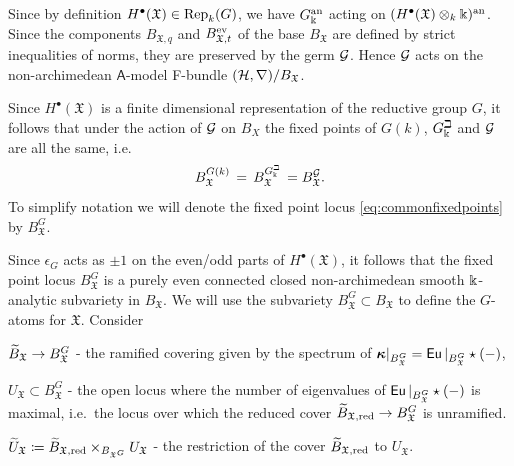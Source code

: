 \documentclass[twoside,leqno]{article}
\numberwithin{equation}{section}
\theoremstyle{plain}
\theoremstyle{definition}
\begin{document}
Since by definition $H^{\bullet}(\mathfrak{X}) \in \operatorname{Rep}_{k}(G)$, we have $G_\Bbbk^{\mathrm{an}}$ acting on $(H^{\bullet}(\mathfrak{X})\otimes_{k} \Bbbk)^{\operatorname{an}}$.
Since the components $B_{\mathfrak{X},q}$ and $B_{\mathfrak{X},t}^{\mathrm{ev}}$ of the base $B_{\mathfrak{X}}$ are defined by strict inequalities of norms, they are preserved by the germ $\mathcal{G}$.
Hence $\mathcal{G}$ acts on the non-archimedean $\mathsf{A}$-model F-bundle $(\mathcal H,\nabla)/B_{\mathfrak{X}}$.

Since $H^{\bullet}(\mathfrak{X})$ is a finite dimensional representation of the reductive group $G$, it follows that under the action of $\mathcal{G}$ on $B_{X}$ the fixed points of $G(k)$, $G_\Bbbk^\beth$ and $\mathcal{G}$ are all the same, i.e.\ 
\begin{equation} \label{eq:commonfixedpoints}
B_{\mathfrak{X}}^{G(k)} \, = \, B_{\mathfrak{X}}^{G_\Bbbk^\beth} \, = B_{\mathfrak{X}}^{\mathcal{G}}.
\end{equation}
To simplify notation we will denote the fixed point locus \eqref{eq:commonfixedpoints} by 
$B^G_{\mathfrak{X}}$. 

\medskip


Since $\epsilon_{G}$ acts as $\pm 1$ on the even/odd parts of $H^{\bullet}(\mathfrak{X})$, it follows that the fixed point locus  $B^G_{\mathfrak{X}}$  is a purely even connected closed non-archimedean smooth $\Bbbk$-analytic subvariety in $B_{\mathfrak{X}}$.  We will use the subvariety $B^G_{\mathfrak{X}} \subset B_{\mathfrak{X}}$ to define the $G$-atoms for $\mathfrak{X}$.
Consider

\begin{description}
    \item $\widetilde{B}_{\mathfrak{X}} \to B^{G}_{\mathfrak{X}}$ - the ramified covering given by the spectrum of $\boldsymbol{\kappa}|_{B^{G}_{\mathfrak{X}}} = \operatorname{\mathsf{Eu}}|_{B^{G}_{\mathfrak{X}}}\star(-)$,
    \item $U_{\mathfrak{X}} \subset B^G_{\mathfrak{X}}$ - the open locus where the number of eigenvalues of $\operatorname{\mathsf{Eu}}|_{B^{G}_{\mathfrak{X}}}\star(-)$ is maximal, i.e.\ the locus over which 
    the reduced cover $\widetilde{B}_{\mathfrak{X},\operatorname{red}} \to  B^{G}_{\mathfrak{X}}$ is unramified.
    \item $\widetilde U_\mathfrak{X} \coloneqq \widetilde{B}_{\mathfrak{X},\operatorname{red}} \times_{B_{\mathfrak{X}^{G}}} U_{\mathfrak{X}}$ - the restriction of the cover $\widetilde{B}_{\mathfrak{X},\operatorname{red}}$ to $U_{\mathfrak{X}}$.
\end{description}
\end{document}
